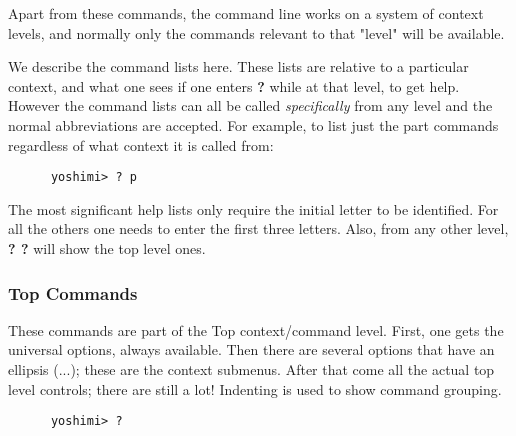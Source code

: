    Apart from these commands, the command line works on a system of context
   levels, and normally only the commands relevant to that "level"
   will be available.

   We describe the command lists here. These lists are relative to a
   particular context, and what one sees if one enters \textbf{?} while at
   that level, to get help. However the command lists can all be called
   \textsl{specifically} from any level and the normal abbreviations are
   accepted. For example, to list just the part commands regardless of what
   context it is called from:
   \begin{verbatim}
      yoshimi> ? p
   \end{verbatim}

   \noindent The most significant help lists only require the initial letter
   to be identified. For all the others one needs to enter the first three
   letters. Also, from any other level, \textbf{? ?} will show the top level
   ones.

\subsubsection{Top Commands}
\label{subsec:command_line_top_command_list}

   These commands are part of the Top context/command level. First, one gets
   the universal options, always available. Then there are several options
   that have an ellipsis (...); these are the context submenus. After that
   come all the actual top level controls; there are still a lot!
   Indenting is used to show command grouping.

   \begin{verbatim}
      yoshimi> ?
   \end{verbatim}


